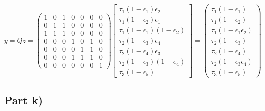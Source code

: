 \documentclass[10pt,a4paper]{article}
\begin{document}
\begin{equation*}
  y = Qz = \begin{pmatrix}
    1 & 0 & 1 & 0 & 0 & 0 & 0\\
    0 & 1 & 1 & 0 & 0 & 0 & 0\\
    1 & 1 & 1 & 0 & 0 & 0 & 0\\
    0 & 0 & 0 & 1 & 0 & 1 & 0\\
    0 & 0 & 0 & 0 & 1 & 1 & 0\\
    0 & 0 & 0 & 1 & 1 & 1 & 0\\
    0 & 0 & 0 & 0 & 0 & 0 & 1
  \end{pmatrix}
  \begin{bmatrix}
    \tau_{1} (1 - \epsilon_{1}) \epsilon_{2}\\
    \tau_{1} (1 - \epsilon_{2}) \epsilon_{1}\\
    \tau_{1} (1 - \epsilon_{1}) (1 - \epsilon_{2})\\
    \tau_{2} (1 - \epsilon_{3}) \epsilon_{4}\\
    \tau_{2} (1 - \epsilon_{4}) \epsilon_{3}\\
    \tau_{2} (1 - \epsilon_{3}) (1 - \epsilon_{4})\\
    \tau_{3} (1 - \epsilon_{5})
  \end{bmatrix} =
  \begin{pmatrix}
    \tau_{1} (1 - \epsilon_{1})\\
    \tau_{1} (1 - \epsilon_{2})\\
    \tau_{1} (1 - \epsilon_{1} \epsilon_{2})\\
    \tau_{2} (1 - \epsilon_{3})\\
    \tau_{2} (1 - \epsilon_{4})\\
    \tau_{2} (1 - \epsilon_{3} \epsilon_{4})\\
    \tau_{3} (1 - \epsilon_{5})
  \end{pmatrix}
\end{equation*}

\subsection*{Part k)}
\end{document}
